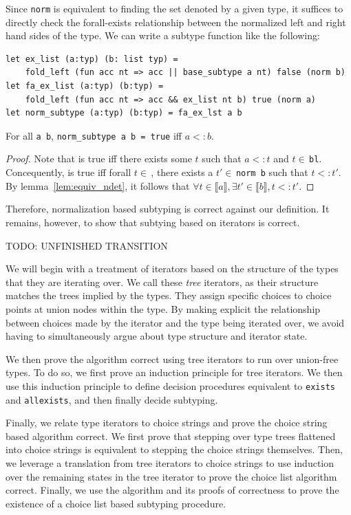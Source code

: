 \documentclass[a4paper,english]{lipics-v2019}
\newcommand{\denotes}[1]{\llbracket #1 \rrbracket}
\begin{document}
Since \lstinline{norm} is equivalent to finding the set denoted by a given
type, it suffices to directly check the forall-exists relationship between the
normalized left and right hand sides of the type. We can write a subtype function
like the following:

\begin{lstlisting}
let ex_list (a:typ) (b: list typ) =
    fold_left (fun acc nt => acc || base_subtype a nt) false (norm b)
let fa_ex_list (a:typ) (b:typ) =
    fold_left (fun acc nt => acc && ex_list nt b) true (norm a)
let norm_subtype (a:typ) (b:typ) = fa_ex_lst a b
\end{lstlisting}

\begin{theorem}
For all {\tt a b}, \lstinline{norm_subtype a b = true} iff $a <: b$.
\end{theorem}
\begin{proof}
Note that  is true iff there exists some 
$t$ such that $a <: t$ and $t \in$\,\lstinline{bl}. Concequently,
 is true iff forall $t \in$\,,
 there exists a $t' \in$\,\lstinline{norm b} such that $t <: t'$. 
By lemma~\ref{lem:equiv_ndet}, it follows that $\forall t \in \denotes{a},
\exists t' \in \denotes{b}, t <: t'$.
\end{proof}

Therefore, normalization based subtyping is correct against our definition.
It remains, however, to show that subtying based on iterators is correct.

TODO: UNFINISHED TRANSITION

We will begin with a treatment of iterators based on the structure of the
types that they are iterating over. We call these \emph{tree} iterators, as
their structure matches the trees implied by the types. They assign specific
choices to choice points at union nodes within the type. By making explicit
the relationship between choices made by the iterator and the type being
iterated over, we avoid having to simultaneously argue about type structure and 
iterator state.

We then prove the algorithm correct using tree iterators to run over union-free
types. To do so, we first prove an induction principle for tree iterators. We then
use this induction principle to define decision procedures equivalent to \verb|exists|
and \verb|allexists|, and then finally decide subtyping.

Finally, we relate type iterators to choice strings and prove the choice
string based algorithm correct. We first prove that stepping over type trees
flattened into choice strings is equivalent to stepping the choice strings
themselves. Then, we  leverage a translation from tree iterators to choice
strings to use induction over the remaining states in the tree iterator to
prove the choice list algorithm correct. Finally, we use the algorithm and its
proofs of correctness to prove the existence of a choice list based subtyping
procedure.
\end{document}
